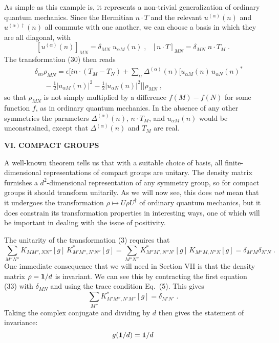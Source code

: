 As simple as this example is, it represents a non-trivial generalization of ordinary quantum mechanics.  Since the Hermitian $n\cdot T$ and the relevant $u^{(\alpha)}(n)$ and $u^{(\alpha)\dagger}(n)$ all commute with one another, we can choose a basis in which they are all diagonal, with
$$ [u^{(\alpha)}(n)]_{MN}=\delta_{MN}\;u_{\alpha M}(n)\;,~~~[n\cdot T]_{MN}=\delta_{MN}\;n\cdot T_{M}\;.$$
The transformation (30) then reads
\begin{eqnarray*}
&&\delta_{\epsilon n}\rho_{MN}=\epsilon\Bigg[in\cdot(T_{M}-T_{N})+\sum_\alpha \Delta^{(\alpha)}(n)\Big[u_{\alpha M}(n)\,u_{\alpha N}(n)^*
\\&&~~~~~~-\frac{1}{2}|u_{\alpha M}(n)|^2-\frac{1}{2}|u_{\alpha N}(n)|^2\Big]\Bigg]\rho_{MN}\;,
\end{eqnarray*}
so that $\rho_{MN}$ is not simply multiplied by a difference $f(M)-f(N)$ for some function $f$, as in ordinary quantum mechanics.  In the absence of any other symmetries the parameters $\Delta^{(\alpha)}(n)$, $n\cdot T_{M}$, and $u_{\alpha M}(n)$ would be  unconstrained, except that $\Delta^{(\alpha)}(n)$ and $T_{
M}$ are real.

\vspace{20pt}

\begin{center}
{\bf VI. COMPACT GROUPS}
\end{center}

A well-known theorem tells us that with a suitable choice of basis, all finite-dimensional representations of compact groups are unitary.  The density matrix furnishes a $d^2$-dimensional representation of any symmetry group, so  for compact groups it should transform unitarily.  As we will now see, this does {\em not} mean that  it undergoes the transformation $\rho\mapsto U\rho U^\dagger$ of ordinary quantum mechanics, but it does constrain its transformation properties in interesting ways, one of which will be important in dealing with the issue of positivity.

The unitarity of the transformation (3) requires that
\begin{equation}
\sum_{M''N''} K_{MM'',NN''}[g]\,K^*_{M'M'',N'N''}[g]=\sum_{M''N''} K^*_{M''M',N''N'}[g]\,K_{M''M,N''N}[g]=\delta_{M'M}\delta_{N'N}\;.
\end{equation}
One immediate consequence that we will need in Section VII is that the density matrix $\rho={\mbox{\boldmath{$1$}}}/d$ is invariant.  We can see this by contracting the first equation (33) with $\delta_{MN}$ and using the trace condition Eq.~(5).  This gives
$$\sum_{M''}K^*_{M'M'',N'M''}[g]=\delta_{M'N'}\;.$$
Taking the complex conjugate and dividing by $d$ then gives the statement of invariance:
\begin{equation}
g({\mbox{\boldmath{$1$}}}/d)={\mbox{\boldmath{$1$}}}/d
\end{equation}

